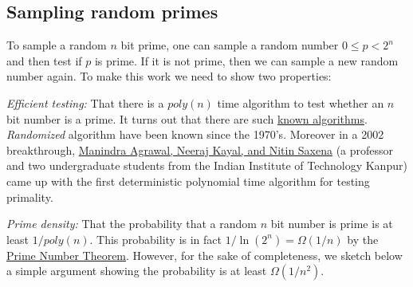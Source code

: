 \hypertarget{DHKErem}{}

\subsection{Sampling random primes}\label{10-Sampling-random-primes}

To sample a random \(n\) bit prime, one can sample a random number
\(0 \leq p < 2^n\) and then test if \(p\) is prime. If it is not prime,
then we can sample a new random number again. To make this work we need
to show two properties:

\emph{Efficient testing:} That there is a \(poly(n)\) time algorithm to
test whether an \(n\) bit number is a prime. It turns out that there are
such \href{https://en.wikipedia.org/wiki/Primality_test}{known
algorithms}. \emph{Randomized} algorithm have been known since the
1970's. Moreover in a 2002 breakthrough,
\href{https://goo.gl/nycWFA}{Manindra Agrawal, Neeraj Kayal, and Nitin
Saxena} (a professor and two undergraduate students from the Indian
Institute of Technology Kanpur) came up with the first deterministic
polynomial time algorithm for testing primality.

\emph{Prime density:} That the probability that a random \(n\) bit
number is prime is at least \(1/poly(n)\). This probability is in fact
\(1/\ln(2^n)=\Omega(1/n)\) by the \href{https://goo.gl/ChrXJY}{Prime
Number Theorem}. However, for the sake of completeness, we sketch below
a simple argument showing the probability is at least \(\Omega(1/n^2)\).

